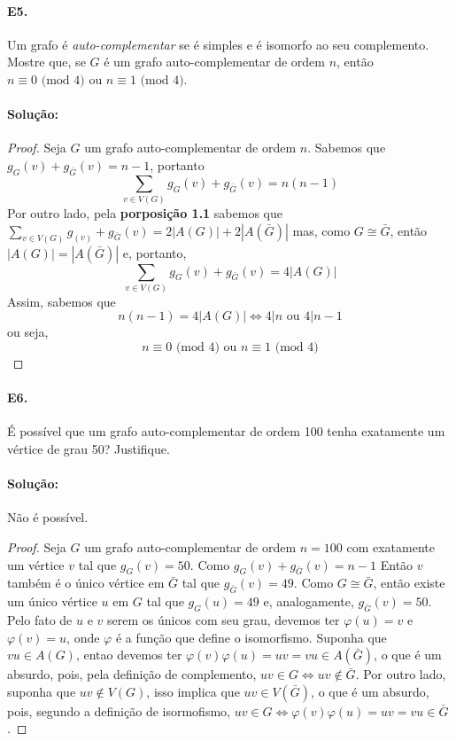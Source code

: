 \documentclass[11pt,a4paper,notitlepage]{exam}
\begin{document}
\paragraph{E5.} Um grafo é \textit{auto-complementar} se é simples e é isomorfo ao seu complemento. Mostre que, se $G$ é um  grafo auto-complementar de ordem $n$, então $n \equiv 0 \text{ (mod } 4)$ ou $n \equiv 1 \text{ (mod } 4)$.
\paragraph{Solução:}
  \begin{proof} 
  Seja $G$ um grafo auto-complementar de ordem $n$. Sabemos que $g_G(v) + g_{\bar{G}}(v) = n-1$, portanto $$\sum_{v \in V(G)}g_G(v) + g_{\bar{G}}(v) = n(n-1)$$ Por outro lado, pela \textbf{porposição 1.1} sabemos que
  $\sum_{v \in V(G)}g_(v) + g_{\bar{G}}(v) = 2|A(G)| + 2|A(\bar{G})|$ 
  mas, como $G \cong \bar{G}$, então $|A(G)| = |A(\bar{G})|$ e, portanto,
  $$\sum_{v \in V(G)}g_G(v) + g_{\bar{G}}(v) = 4|A(G)|$$
  Assim, sabemos que 
  $$
  n(n-1) = 4|A(G)| \Longleftrightarrow 4|n \text{ ou } 4|n-1
  $$ 
  ou seja,
  $$
  n \equiv 0 \text{ (mod } 4) \text{ ou } n \equiv 1 \text{ (mod } 4)
  $$
  \end{proof}
  \newpage
\paragraph{E6.} É possível que um grafo auto-complementar de ordem 100 tenha exatamente um vértice de grau 50? Justifique.
\paragraph{Solução:} Não é possível.\\
\begin{proof}
  Seja $G$ um grafo auto-complementar de ordem $n = 100$ com exatamente um vértice $v$ tal que $g_G(v) = 50$. Como $g_G(v) + g_{\bar{G}}(v) = n-1$ Então $v$ também é o único vértice em $\bar{G}$ tal que $g_{\bar{G}}(v) = 49$. Como $G \cong \bar{G}$, então existe um único vértice $u$ em $G$ tal que $g_G(u) = 49$ e, analogamente, $g_{\bar{G}}(v) = 50$. Pelo fato de $u$ e $v$ serem os únicos com seu grau, devemos ter $\varphi(u) = v$ e $\varphi(v) = u$, onde $\varphi$ é a função que define o isomorfismo. Suponha que $vu \in A(G)$, entao devemos ter $\varphi(v)\varphi(u) = uv = vu \in A(\bar{G})$, o que é um absurdo, pois, pela definição de complemento, $uv \in G \Longleftrightarrow uv \notin \bar{G}$. Por outro lado, suponha que $uv \notin V(G)$, isso implica que $uv \in V(\bar{G})$, o que é um absurdo, pois, segundo a definição de isormofismo, $uv \in G \Longleftrightarrow \varphi(v)\varphi(u) = uv = vu \in \bar{G}$.
\end{proof}
\end{document}
